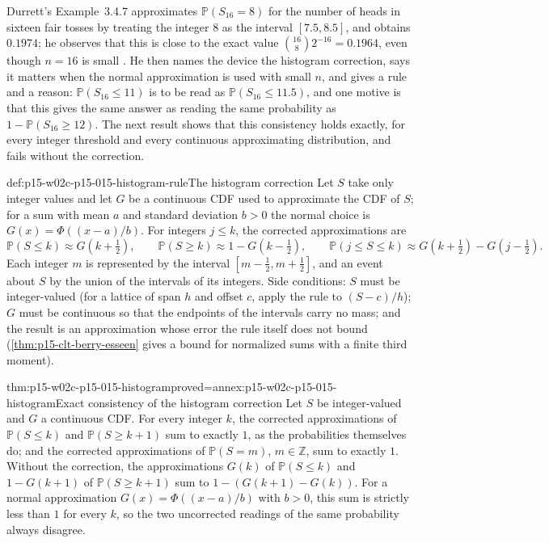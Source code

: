 Durrett's Example~3.4.7 approximates \(\mathbb P(S_{16}=8)\) for the
number of heads in sixteen fair tosses by treating the integer \(8\) as
the interval \([7.5,8.5]\), and obtains \(0.1974\); he observes that
this is close to the exact value \(\binom{16}8 2^{-16}=0.1964\), even
though \(n=16\) is small \cite[p.~146]{DurrettPTEAuthor2019}. He then
names the device the histogram correction, says it matters when the
normal approximation is used with small \(n\), and gives a rule and a
reason: \(\mathbb P(S_{16}\leq11)\) is to be read as
\(\mathbb P(S_{16}\leq11.5)\), and one motive is that this gives the
same answer as reading the same probability as
\(1-\mathbb P(S_{16}\geq12)\). The next result shows that this
consistency holds exactly, for every integer threshold and every
continuous approximating distribution, and fails without the
correction.

\begin{hbmethod}{def:p15-w02c-p15-015-histogram-rule}{The histogram correction}
Let \(S\) take only integer values and let \(G\) be a continuous CDF
used to approximate the CDF of \(S\); for a sum with mean \(a\) and
standard deviation \(b>0\) the normal choice is
\(G(x)=\Phi((x-a)/b)\). For integers \(j\leq k\), the corrected
approximations are
\[
 \mathbb P(S\leq k)\approx G(k+\tfrac12),\qquad
 \mathbb P(S\geq k)\approx1-G(k-\tfrac12),\qquad
 \mathbb P(j\leq S\leq k)\approx G(k+\tfrac12)-G(j-\tfrac12).
\]
Each integer \(m\) is represented by the interval
\([m-\tfrac12,m+\tfrac12]\), and an event about \(S\) by the union of
the intervals of its integers. Side conditions: \(S\) must be
integer-valued (for a lattice of span \(h\) and offset \(c\), apply the
rule to \((S-c)/h\)); \(G\) must be continuous so that the endpoints of
the intervals carry no mass; and the result is an approximation whose
error the rule itself does not bound (\cref{thm:p15-clt-berry-esseen}
gives a bound for normalized sums with a finite third moment).
\end{hbmethod}

\begin{hbtheorem}{thm:p15-w02c-p15-015-histogram}{proved=annex:p15-w02c-p15-015-histogram}{Exact consistency of the histogram correction}
Let \(S\) be integer-valued and \(G\) a continuous CDF. For every
integer \(k\), the corrected approximations of
\(\mathbb P(S\leq k)\) and \(\mathbb P(S\geq k+1)\) sum to exactly
\(1\), as the probabilities themselves do; and the corrected
approximations of \(\mathbb P(S=m)\), \(m\in\mathbb Z\), sum to
exactly \(1\). Without the correction, the approximations
\(G(k)\) of \(\mathbb P(S\leq k)\) and \(1-G(k+1)\) of
\(\mathbb P(S\geq k+1)\) sum to \(1-(G(k+1)-G(k))\). For a normal
approximation \(G(x)=\Phi((x-a)/b)\) with \(b>0\), this sum is strictly
less than \(1\) for every \(k\), so the two uncorrected readings of
the same probability always disagree.
\end{hbtheorem}


